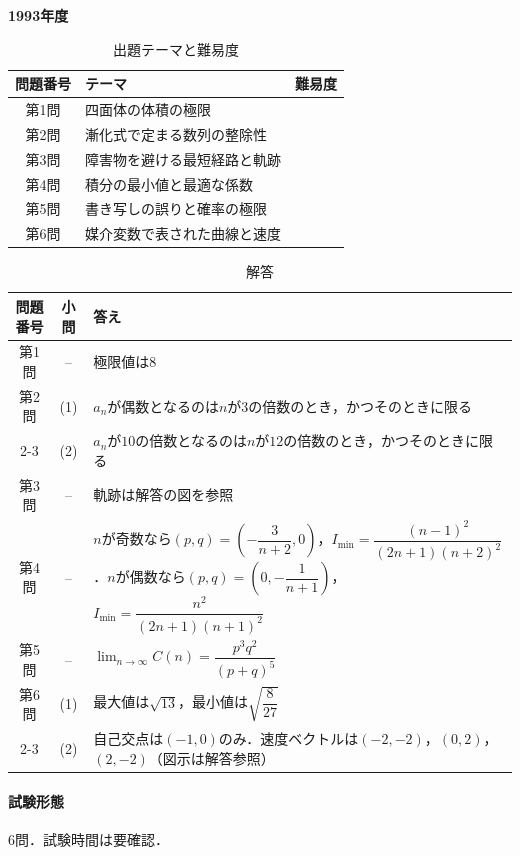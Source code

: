 \documentclass[../../main.tex]{subfiles}
\begin{document}
\begin{center}
  {\fontsize{48pt}{58pt}\selectfont \textbf{1993}\normalsize\textbf{年度}}
\end{center}

\begin{table}[htb]
  \centering
  \caption{出題テーマと難易度}
  \begin{tabular}{|c|p{9cm}|c|}
    \hline
    \textbf{問題番号} & \textbf{テーマ} & \textbf{難易度} \\
    \hline
    第1問 & 四面体の体積の極限 & \\
    \hline
    第2問 & 漸化式で定まる数列の整除性 & \\
    \hline
    第3問 & 障害物を避ける最短経路と軌跡 & \\
    \hline
    第4問 & 積分の最小値と最適な係数 & \\
    \hline
    第5問 & 書き写しの誤りと確率の極限 & \\
    \hline
    第6問 & 媒介変数で表された曲線と速度 & \\
    \hline
  \end{tabular}
\end{table}

\begin{table}[htb]
  \centering
  \caption{解答}
  \renewcommand{\arraystretch}{1.4}
  \begin{tabular}{|c|c|p{9cm}|}
    \hline
    \textbf{問題番号} & \textbf{小問} & \textbf{答え} \\
    \hline
    第1問 & -- & 極限値は$8$ \\
    \hline
    第2問 & (1) & $a_n$が偶数となるのは$n$が$3$の倍数のとき，かつそのときに限る \\
    \cline{2-3}
    & (2) & $a_n$が$10$の倍数となるのは$n$が$12$の倍数のとき，かつそのときに限る \\
    \hline
    第3問 & -- & 軌跡は解答の図を参照 \\
    \hline
    第4問 & -- & $n$が奇数なら$(p,q)=\left(-\dfrac{3}{n+2},0\right)$，$I_{\min}=\dfrac{(n-1)^2}{(2n+1)(n+2)^2}$．$n$が偶数なら$(p,q)=\left(0,-\dfrac{1}{n+1}\right)$，$I_{\min}=\dfrac{n^2}{(2n+1)(n+1)^2}$ \\
    \hline
    第5問 & -- & $\displaystyle\lim_{n\to\infty}C(n)=\dfrac{p^3q^2}{(p+q)^5}$ \\
    \hline
    第6問 & (1) & 最大値は$\sqrt{13}$，最小値は$\sqrt{\dfrac{8}{27}}$ \\
    \cline{2-3}
    & (2) & 自己交点は$(-1,0)$のみ．速度ベクトルは$(-2,-2)$，$(0,2)$，$(2,-2)$（図示は解答参照） \\
    \hline
  \end{tabular}
\end{table}

\paragraph{試験形態}
6問．試験時間は要確認．
\end{document}
